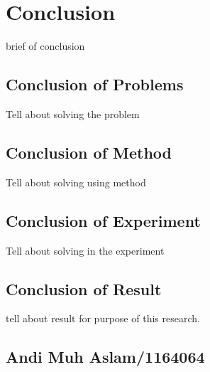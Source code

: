 \chapter{Conclusion}
brief of conclusion

\section{Conclusion of Problems}
Tell about solving the problem

\section{Conclusion of Method}
Tell about solving using method

\section{Conclusion of Experiment}
Tell about solving in the experiment

\section{Conclusion of Result}
tell about result for purpose of this research.

\section{Andi Muh Aslam/1164064}
